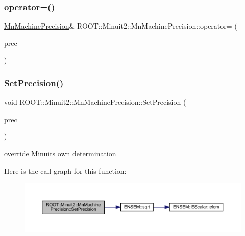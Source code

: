 \subsubsection{\texorpdfstring{operator=()}{operator=()}\hspace{0.1cm}{\footnotesize\ttfamily [3/3]}}
{\footnotesize\ttfamily \mbox{\hyperlink{classROOT_1_1Minuit2_1_1MnMachinePrecision}{Mn\+Machine\+Precision}}\& R\+O\+O\+T\+::\+Minuit2\+::\+Mn\+Machine\+Precision\+::operator= (\begin{DoxyParamCaption}\item[{const \mbox{\hyperlink{classROOT_1_1Minuit2_1_1MnMachinePrecision}{Mn\+Machine\+Precision}} \&}]{prec }\end{DoxyParamCaption})\hspace{0.3cm}{\ttfamily [inline]}}

\mbox{\label{classROOT_1_1Minuit2_1_1MnMachinePrecision_a625938e3c6362a06d09fc76e59f366b6}} 
\subsubsection{\texorpdfstring{SetPrecision()}{SetPrecision()}\hspace{0.1cm}{\footnotesize\ttfamily [1/3]}}
{\footnotesize\ttfamily void R\+O\+O\+T\+::\+Minuit2\+::\+Mn\+Machine\+Precision\+::\+Set\+Precision (\begin{DoxyParamCaption}\item[{double}]{prec }\end{DoxyParamCaption})\hspace{0.3cm}{\ttfamily [inline]}}



override Minuit\textquotesingle{}s own determination 

Here is the call graph for this function\+:
\nopagebreak
\begin{figure}[H]
\begin{center}
\leavevmode
\includegraphics[width=350pt]{d4/d40/classROOT_1_1Minuit2_1_1MnMachinePrecision_a625938e3c6362a06d09fc76e59f366b6_cgraph}
\end{center}
\end{figure}
\mbox{\label{classROOT_1_1Minuit2_1_1MnMachinePrecision_a625938e3c6362a06d09fc76e59f366b6}} 
